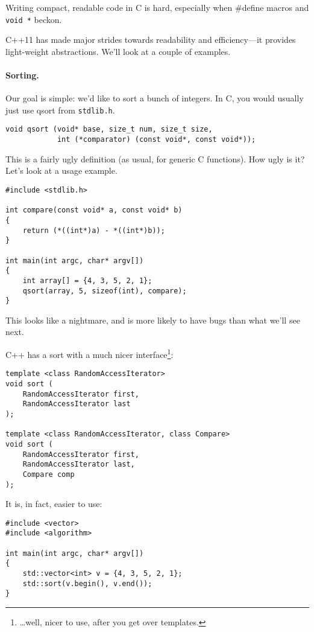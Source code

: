 \documentclass[11pt]{article}
\begin{document}
 Writing compact, readable code in C is hard, especially when \#define
macros and {\tt void *} beckon.

    C++11 has made major strides towards readability and
    efficiency---it provides light-weight abstractions. We'll look at
    a couple of examples.

\paragraph{Sorting.} Our goal is simple: we'd like to sort a bunch of integers.
In C, you would usually just use qsort from {\tt stdlib.h}.

  \begin{lstlisting}
void qsort (void* base, size_t num, size_t size,
            int (*comparator) (const void*, const void*));
  \end{lstlisting}

This is a fairly ugly definition (as usual, for generic C functions). How ugly is it?
Let's look at a usage example.
  \begin{lstlisting}[basicstyle=\small]
#include <stdlib.h>

int compare(const void* a, const void* b)
{
    return (*((int*)a) - *((int*)b));
}

int main(int argc, char* argv[])
{
    int array[] = {4, 3, 5, 2, 1};
    qsort(array, 5, sizeof(int), compare);
}
  \end{lstlisting}
This looks like a nightmare, and is more likely to have bugs than what we'll see next.

\newpage
C++ has a sort with a much nicer interface\footnote{\ldots well, nicer to use, after you get over templates.}:

  \begin{lstlisting}[basicstyle=\small]
template <class RandomAccessIterator>
void sort (
    RandomAccessIterator first,
    RandomAccessIterator last
);

template <class RandomAccessIterator, class Compare>
void sort (
    RandomAccessIterator first,
    RandomAccessIterator last,
    Compare comp
);
  \end{lstlisting}
It is, in fact, easier to use:
  \begin{lstlisting}[basicstyle=\small]
#include <vector>
#include <algorithm>

int main(int argc, char* argv[])
{
    std::vector<int> v = {4, 3, 5, 2, 1};
    std::sort(v.begin(), v.end());
}
  \end{lstlisting}
\end{document}
